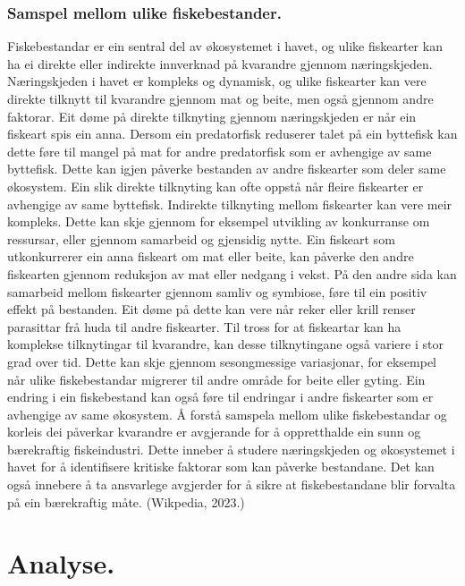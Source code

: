 \documentclass{report}
\begin{document}
\subsection{Samspel mellom ulike fiskebestander.}
Fiskebestandar er ein sentral del av økosystemet i havet, og ulike fiskearter kan ha ei direkte eller indirekte innverknad på kvarandre gjennom næringskjeden. Næringskjeden i havet er kompleks og dynamisk, og ulike fiskearter kan vere direkte tilknytt til kvarandre gjennom mat og beite, men også gjennom andre faktorar.
Eit døme på direkte tilknyting gjennom næringskjeden er når ein fiskeart spis ein anna.
Dersom ein predatorfisk reduserer talet på ein byttefisk kan dette føre til mangel på mat for andre predatorfisk som er avhengige av same byttefisk. Dette kan igjen påverke bestanden av andre fiskearter som deler same økosystem.
Ein slik direkte tilknyting kan ofte oppstå når fleire fiskearter er avhengige av same byttefisk.
Indirekte tilknyting mellom fiskearter kan vere meir kompleks. Dette kan skje gjennom for eksempel utvikling av konkurranse om ressursar, eller gjennom samarbeid og gjensidig nytte. Ein fiskeart som utkonkurrerer ein anna fiskeart om mat eller beite, kan påverke den andre fiskearten gjennom reduksjon av mat eller nedgang i vekst. På den andre sida kan samarbeid mellom fiskearter gjennom samliv og symbiose, føre til ein positiv effekt på bestanden. Eit døme på dette kan vere når reker eller krill renser parasittar frå huda til andre fiskearter.
Til tross for at fiskeartar kan ha komplekse tilknytingar til kvarandre, kan desse tilknytingane også variere i stor grad over tid. Dette kan skje gjennom sesongmessige variasjonar, for eksempel når ulike fiskebestandar migrerer til andre område for beite eller gyting. Ein endring i ein fiskebestand kan også føre til endringar i andre fiskearter som er avhengige av same økosystem.
Å forstå samspela mellom ulike fiskebestandar og korleis dei påverkar kvarandre er avgjerande for å oppretthalde ein sunn og bærekraftig fiskeindustri. Dette inneber å studere næringskjeden og økosystemet i havet for å identifisere kritiske faktorar som kan påverke bestandane. Det kan også innebere å ta ansvarlege avgjerder for å sikre at fiskebestandane blir forvalta på ein bærekraftig måte.
(Wikpedia, 2023.)
\chapter{Analyse.}
\end{document}
